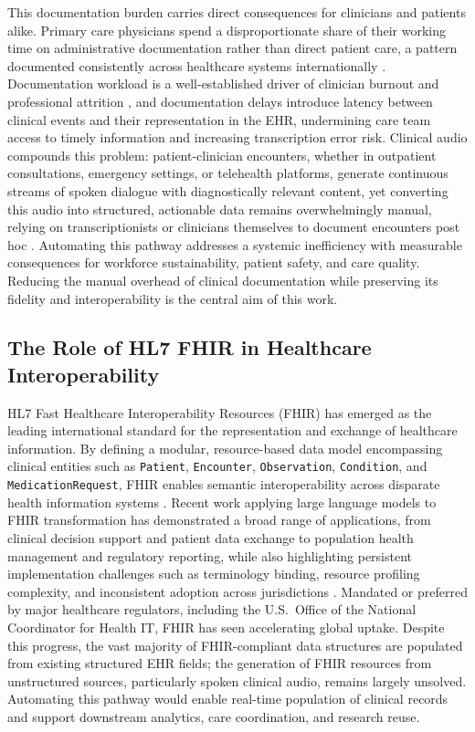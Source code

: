 This documentation burden carries direct consequences for clinicians and patients alike. Primary care physicians spend a disproportionate share of their working time on administrative documentation rather than direct patient care, a pattern documented consistently across healthcare systems internationally \cite{saadat2025enhancing}. Documentation workload is a well-established driver of clinician burnout and professional attrition \cite{klusty2024clinical}, and documentation delays introduce latency between clinical events and their representation in the EHR, undermining care team access to timely information and increasing transcription error risk. Clinical audio compounds this problem: patient-clinician encounters, whether in outpatient consultations, emergency settings, or telehealth platforms, generate continuous streams of spoken dialogue with diagnostically relevant content, yet converting this audio into structured, actionable data remains overwhelmingly manual, relying on transcriptionists or clinicians themselves to document encounters post hoc \cite{saadat2025enhancing, klusty2024clinical}. Automating this pathway addresses a systemic inefficiency with measurable consequences for workforce sustainability, patient safety, and care quality. Reducing the manual overhead of clinical documentation while preserving its fidelity and interoperability is the central aim of this work.

\subsection{The Role of HL7 FHIR in Healthcare Interoperability}

HL7 Fast Healthcare Interoperability Resources (FHIR) has emerged as the leading international standard for the representation and exchange of healthcare information. By defining a modular, resource-based data model encompassing clinical entities such as \texttt{Patient}, \texttt{Encounter}, \texttt{Observation}, \texttt{Condition}, and \texttt{MedicationRequest}, FHIR enables semantic interoperability across disparate health information systems \cite{hl7fhir2022r4b}. Recent work applying large language models to FHIR transformation has demonstrated a broad range of applications, from clinical decision support and patient data exchange to population health management and regulatory reporting, while also highlighting persistent implementation challenges such as terminology binding, resource profiling complexity, and inconsistent adoption across jurisdictions \cite{li2024fhirgpt}. Mandated or preferred by major healthcare regulators, including the U.S.\ Office of the National Coordinator for Health IT, FHIR has seen accelerating global uptake. Despite this progress, the vast majority of FHIR-compliant data structures are populated from existing structured EHR fields; the generation of FHIR resources from unstructured sources, particularly spoken clinical audio, remains largely unsolved. Automating this pathway would enable real-time population of clinical records and support downstream analytics, care coordination, and research reuse.

